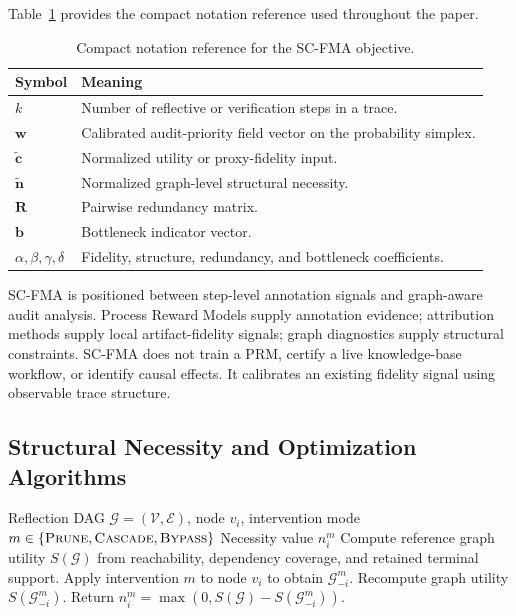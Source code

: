 \documentclass[pdflatex,sn-mathphys-num]{sn-jnl}
\begin{document}
Table~\ref{tab:supp-notation} provides the compact notation reference used throughout the paper.

\begin{table}[ht]
\caption{Compact notation reference for the SC-FMA objective.}
\label{tab:supp-notation}
\centering
\small
\begin{tabular}{ll}
\toprule
\textbf{Symbol} & \textbf{Meaning} \\
\midrule
$k$ & Number of reflective or verification steps in a trace. \\
$\mathbf{w}$ & Calibrated audit-priority field vector on the probability simplex. \\
$\tilde{\mathbf{c}}$ & Normalized utility or proxy-fidelity input. \\
$\tilde{\mathbf{n}}$ & Normalized graph-level structural necessity. \\
$\mathbf{R}$ & Pairwise redundancy matrix. \\
$\mathbf{b}$ & Bottleneck indicator vector. \\
$\alpha,\beta,\gamma,\delta$ & Fidelity, structure, redundancy, and bottleneck coefficients. \\
\bottomrule
\end{tabular}
\end{table}

SC-FMA is positioned between step-level annotation signals and graph-aware audit analysis. Process Reward Models supply annotation evidence; attribution methods supply local artifact-fidelity signals; graph diagnostics supply structural constraints. SC-FMA does not train a PRM, certify a live knowledge-base workflow, or identify causal effects. It calibrates an existing fidelity signal using observable trace structure.

\subsection{Structural Necessity and Optimization Algorithms}
\label{app:algorithms}

\begin{algorithm}[ht]
\caption{Structural Necessity Computation}
\label{alg:supp-structural-necessity}
\begin{algorithmic}[1]
\Require Reflection DAG $\mathcal{G}=(\mathcal{V},\mathcal{E})$, node $v_i$, intervention mode $m\in\{\textsc{Prune},\textsc{Cascade},\textsc{Bypass}\}$
\Ensure Necessity value $n_i^{m}$
\State Compute reference graph utility $S(\mathcal{G})$ from reachability, dependency coverage, and retained terminal support.
\State Apply intervention $m$ to node $v_i$ to obtain $\mathcal{G}_{-i}^{m}$.
\State Recompute graph utility $S(\mathcal{G}_{-i}^{m})$.
\State Return $n_i^{m}=\max(0,S(\mathcal{G})-S(\mathcal{G}_{-i}^{m}))$.
\end{algorithmic}
\end{algorithm}
\end{document}
